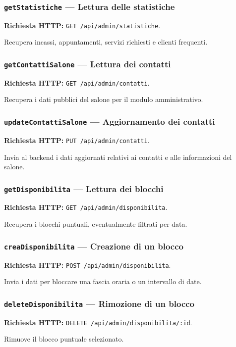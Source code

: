 \documentclass[12pt,a4paper]{article}
\begin{document}
\subsubsection{\texttt{getStatistiche} --- Lettura delle statistiche}
\textbf{Richiesta HTTP:} \texttt{GET /api/admin/statistiche}.

Recupera incassi, appuntamenti, servizi richiesti e clienti frequenti.

\subsubsection{\texttt{getContattiSalone} --- Lettura dei contatti}
\textbf{Richiesta HTTP:} \texttt{GET /api/admin/contatti}.

Recupera i dati pubblici del salone per il modulo amministrativo.

\subsubsection{\texttt{updateContattiSalone} --- Aggiornamento dei contatti}
\textbf{Richiesta HTTP:} \texttt{PUT /api/admin/contatti}.

Invia al backend i dati aggiornati relativi ai contatti e alle informazioni
del salone.

\subsubsection{\texttt{getDisponibilita} --- Lettura dei blocchi}
\textbf{Richiesta HTTP:} \texttt{GET /api/admin/disponibilita}.

Recupera i blocchi puntuali, eventualmente filtrati per data.

\subsubsection{\texttt{creaDisponibilita} --- Creazione di un blocco}
\textbf{Richiesta HTTP:} \texttt{POST /api/admin/disponibilita}.

Invia i dati per bloccare una fascia oraria o un intervallo di date.

\subsubsection{\texttt{deleteDisponibilita} --- Rimozione di un blocco}
\textbf{Richiesta HTTP:} \texttt{DELETE /api/admin/disponibilita/:id}.

Rimuove il blocco puntuale selezionato.
\end{document}
